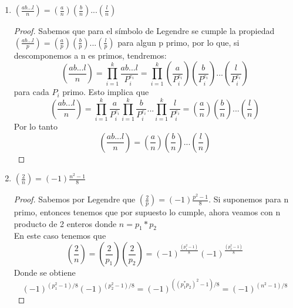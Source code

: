 \documentclass[12pt, letterpaper]{article}
\begin{document}
\begin{enumerate}
\begin{proof}
De acuerdo con el símbolo de Legendre, para p un primo impar, se tiene $(\frac{-1}{p})=(-1)^\frac{p-1}{2}$
\\Sea el caso de n primo, por definición cumple. Por otro lado, suponemos a $n=p_1 * p_2$ con p1 y p2 primos.
\\Entonces tenemos que$(\frac{-1}{n})= (\frac{-1}{p_1}) (\frac{-1}{p_2}) $
 donde
 \[(\frac{-1}{p_1}) (\frac{-1}{p_2}) = (-1)^\frac{(p_1-1)}{2}(-1)^\frac{(p_2-1)}{2}=(-1)^{(p_1-1)/2+(p_2-1)/2}=(-1)^{(p_1* p_2-1)/2}
 \] que a su vez, de acuerdo a un lema de otra propiedad de Legendre, obtenemos
 \[
 (-1)^{(p_1* p_2-1)/2} = (-1)^\frac{n-1}{2}
 \]
así que si procedemos a descomponer a n en primos tendríamos que $(\frac{-1}{p})= \prod_{i=1}^k \frac{-1}{P_i^ei}$ que es lo mismo que $(\frac{-1}{p})= \prod_{i=1}^k [(-1)^\frac{(p_i-1)}{2}]^{e_i}$.
\\
Entonces obtenemos 
\[(\frac{-1}{p})= (-1)^{\sum_{i=1}^k{e_i}\frac{(p_i-1)}{2}}= (-1)^\frac{(n-1)}{2}\]
para k primos
\end{proof}

\item $(\frac{ab...l}{n}) = (\frac{a}{n})(\frac{b}{n})...(\frac{l}{n})$
\\
\begin{proof}


Sabemos que para el símbolo de Legendre se cumple la propiedad $(\frac{ab...l}{p}) = (\frac{a}{p})(\frac{b}{p})...(\frac{l}{p})$ para algun p primo, por lo que, si descomponemos a n es primos, tendremos:
\[
\left(\frac{ab...l}{n}\right)=\prod_{i=1}^k \frac{ab...l}{P_i^{e_i}}=\prod_{i=1}^k \left(\frac{a}{P_i^{e_i}}\right)\left(\frac{b}{P_i^{e_i}}\right)...\left(\frac{l}{P_i^{e_i}}\right)
\] para cada $P_i$ primo. Esto implica que 
\[
\left(\frac{ab...l}{n}\right)=\prod_{i=1}^k \frac{a}{P_i^{e_i}} \prod_{i=1}^k \frac{b}{P_i^{e_i}} ... \prod_{i=1}^k \frac{l}{P_i^{e_i}}= \left(\frac{a}{n}\right)\left(\frac{b}{n}\right)...\left(\frac{l}{n}\right)
\]
Por lo tanto
\[
\left(\frac{ab...l}{n}\right)= \left(\frac{a}{n}\right)\left(\frac{b}{n}\right)...\left(\frac{l}{n}\right)
\]
\end{proof}
\item $(\frac{2}{n})=(-1)\frac{n^2-1}{8}$
\begin{proof}
Sabemos por Legendre que $(\frac{2}{p})=(-1)\frac{p^2-1}{8}$. Si suponemos para n primo, entonces tenemos que por supuesto lo cumple, ahora veamos con n producto de 2 enteros donde $n= p_1*p_2$
\\
En este caso tenemos que 
\\
\[
\left(\frac{2}{n}\right)= \left( \frac{2}{p_1} \right) \left(\frac{2}{p_2}\right) =\left(-1\right)^\frac{\left(p_1^2-1\right)}{8}\left(-1\right)^\frac{\left(p_2^2-1\right)}{8}
\]
Donde se obtiene
\[
\left(-1\right)^{\left(p_1^2-1\right)/8}\left(-1\right)^{\left(p_2^2-1\right)/8}=\left(-1\right)^{\left(\left(p_1^*p_2\right)^2-1\right)/8}=\left(-1\right)^{\left(n^2-1\right)/8}
\]


\end{proof}
\end{enumerate}
\end{document}
